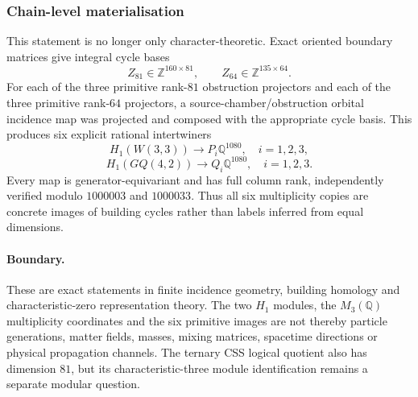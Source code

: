 \subsubsection{Chain-level materialisation}
This statement is no longer only character-theoretic.  Exact oriented boundary
matrices give integral cycle bases
\[
 Z_{81}\in\mathbb Z^{160\times81},\qquad
 Z_{64}\in\mathbb Z^{135\times64}.
\]
For each of the three primitive rank-$81$ obstruction projectors and each of
the three primitive rank-$64$ projectors, a source-chamber/obstruction orbital
incidence map was projected and composed with the appropriate cycle basis.
This produces six explicit rational intertwiners
\[
 H_1(W(3,3))\longrightarrow P_i\mathbb Q^{1080},\quad i=1,2,3,
\]
\[
 H_1(GQ(4,2))\longrightarrow Q_i\mathbb Q^{1080},\quad i=1,2,3.
\]
Every map is generator-equivariant and has full column rank, independently
verified modulo $1000003$ and $1000033$.  Thus all six multiplicity copies are
concrete images of building cycles rather than labels inferred from equal
dimensions.

\paragraph{Boundary.}
These are exact statements in finite incidence geometry, building homology and
characteristic-zero representation theory.  The two $H_1$ modules, the
$M_3(\mathbb Q)$ multiplicity coordinates and the six primitive images are not
thereby particle generations, matter fields, masses, mixing matrices,
spacetime directions or physical propagation channels.  The ternary CSS
logical quotient also has dimension $81$, but its characteristic-three module
identification remains a separate modular question.
